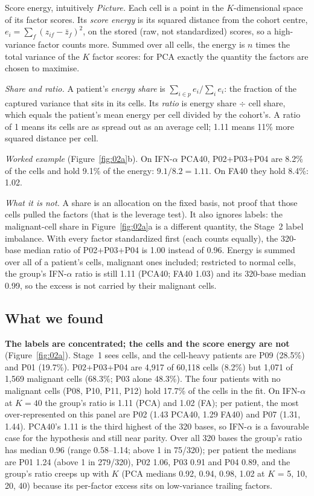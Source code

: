 \begin{explainbox}{Score energy, intuitively}
\emph{Picture.} Each cell is a point in the $K$-dimensional space of its factor scores. Its \emph{score energy} is its squared distance from the cohort centre, $e_i = \sum_f (z_{if} - \bar z_f)^2$, on the stored (raw, not standardized) scores, so a high-variance factor counts more. Summed over all cells, the energy is $n$ times the total variance of the $K$ factor scores: for PCA exactly the quantity the factors are chosen to maximise.

\emph{Share and ratio.} A patient's \emph{energy share} is $\sum_{i \in p} e_i / \sum_i e_i$: the fraction of the captured variance that sits in its cells. Its \emph{ratio} is energy share $\div$ cell share, which equals the patient's mean energy per cell divided by the cohort's. A ratio of 1 means its cells are as spread out as an average cell; 1.11 means 11\% more squared distance per cell.

\emph{Worked example} (Figure~\ref{fig:02a}b). On IFN-$\alpha$ PCA40, P02+P03+P04 are 8.2\% of the cells and hold 9.1\% of the energy: $9.1 / 8.2 = 1.11$. On FA40 they hold 8.4\%: 1.02.

\emph{What it is not.} A share is an allocation on the fixed basis, not proof that those cells pulled the factors (that is the leverage test). It also ignores labels: the malignant-cell share in Figure~\ref{fig:02a}a is a different quantity, the Stage~2 label imbalance. With every factor standardized first (each counts equally), the 320-base median ratio of P02+P03+P04 is 1.00 instead of 0.96. Energy is summed over all of a patient's cells, malignant ones included; restricted to normal cells, the group's IFN-$\alpha$ ratio is still 1.11 (PCA40; FA40 1.03) and its 320-base median 0.99, so the excess is not carried by their malignant cells. 
\end{explainbox}

\subsection*{What we found}

\textbf{The labels are concentrated; the cells and the score energy are not} (Figure~\ref{fig:02a}).
Stage~1 sees cells, and the cell-heavy patients are P09 (28.5\%) and P01 (19.7\%). P02+P03+P04 are 4,917 of 60,118 cells (8.2\%) but 1,071 of 1,569 malignant cells (68.3\%; P03 alone 48.3\%). The four patients with no malignant cells (P08, P10, P11, P12) hold 17.7\% of the cells in the fit. On IFN-$\alpha$ at $K = 40$ the group's ratio is 1.11 (PCA) and 1.02 (FA); per patient, the most over-represented on this panel are P02 (1.43 PCA40, 1.29 FA40) and P07 (1.31, 1.44). PCA40's 1.11 is the third highest of the 320 bases, so IFN-$\alpha$ is a favourable case for the hypothesis and still near parity. Over all 320 bases the group's ratio has median 0.96 (range 0.58--1.14; above 1 in 75/320); per patient the medians are P01 1.24 (above 1 in 279/320), P02 1.06, P03 0.91 and P04 0.89, and the group's ratio creeps up with $K$ (PCA medians 0.92, 0.94, 0.98, 1.02 at $K$ = 5, 10, 20, 40) because its per-factor excess sits on low-variance trailing factors. 


